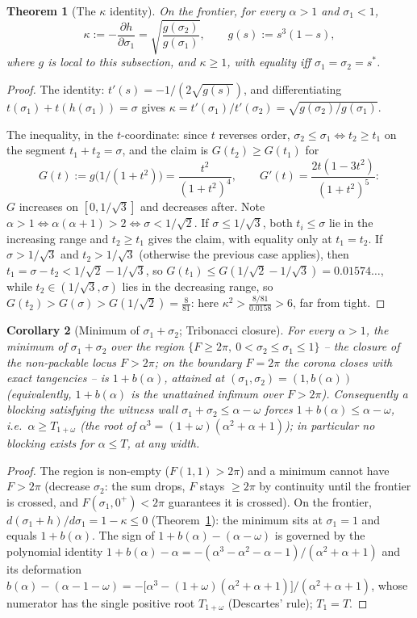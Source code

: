 \documentclass[11pt]{article}
\newtheorem{theorem}{Theorem}
\newtheorem{corollary}[theorem]{Corollary}
\theoremstyle{definition}
\begin{document}
\begin{theorem}[The $\kappa$ identity]\label{thm:Ckappa}
On the frontier, for every $\alpha>1$ and $\sigma_1<1$,
\[
\kappa:=-\frac{\partial h}{\partial\sigma_1}
=\sqrt{\frac{g(\sigma_2)}{g(\sigma_1)}},\qquad
g(s):=s^3(1-s),
\]
where $g$ is local to this subsection, and $\kappa\ge1$,
with equality iff $\sigma_1=\sigma_2=s^*$.
\end{theorem}
\begin{proof}
The identity: $t'(s)=-1/(2\sqrt{g(s)})$, and differentiating
$t(\sigma_1)+t(h(\sigma_1))=\sigma$ gives
$\kappa=t'(\sigma_1)/t'(\sigma_2)=\sqrt{g(\sigma_2)/g(\sigma_1)}$.

The inequality, in the $t$-coordinate: since $t$ reverses order,
$\sigma_2\le\sigma_1\iff t_2\ge t_1$ on the segment $t_1+t_2=\sigma$, and
the claim is $G(t_2)\ge G(t_1)$ for
\[
G(t):=g\bigl(1/(1+t^2)\bigr)=\frac{t^2}{(1+t^2)^4},\qquad
G'(t)=\frac{2t(1-3t^2)}{(1+t^2)^5}:
\]
$G$ increases on $[0,1/\sqrt3]$ and decreases after. Note
$\alpha>1\iff\alpha(\alpha+1)>2\iff\sigma<1/\sqrt2$. If
$\sigma\le1/\sqrt3$, both $t_i\le\sigma$ lie in the increasing range and
$t_2\ge t_1$ gives the claim, with equality only at $t_1=t_2$. If
$\sigma>1/\sqrt3$ and $t_2>1/\sqrt3$ (otherwise the previous case
applies), then $t_1=\sigma-t_2<1/\sqrt2-1/\sqrt3$, so
$G(t_1)\le G(1/\sqrt2-1/\sqrt3)=0.01574\dots$, while
$t_2\in(1/\sqrt3,\sigma)$ lies in the decreasing range, so
$G(t_2)>G(\sigma)>G(1/\sqrt2)=\tfrac{8}{81}$: here
$\kappa^2>\tfrac{8/81}{0.0158}>6$, far from tight.
\end{proof}

\begin{corollary}[Minimum of $\sigma_1+\sigma_2$; Tribonacci closure]
\label{cor:Cmin}
For every $\alpha>1$, the minimum of $\sigma_1+\sigma_2$ over the
region $\{F\ge2\pi,\ 0<\sigma_2\le\sigma_1\le1\}$ -- the closure of
the non-packable locus $F>2\pi$; on the boundary $F=2\pi$ the corona
closes with exact tangencies -- is
$1+b(\alpha)$, attained at $(\sigma_1,\sigma_2)=(1,b(\alpha))$
(equivalently, $1+b(\alpha)$ is the unattained infimum over
$F>2\pi$).
Consequently a blocking satisfying the witness wall
$\sigma_1+\sigma_2\le\alpha-\omega$ forces $1+b(\alpha)\le\alpha-\omega$,
i.e.\ $\alpha\ge T_{1+\omega}$ (the root of
$\alpha^3=(1+\omega)(\alpha^2+\alpha+1)$); in particular no blocking exists
for $\alpha\le T$, at any width.
\end{corollary}
\begin{proof}
The region is non-empty ($F(1,1)>2\pi$) and a minimum cannot have
$F>2\pi$ (decrease $\sigma_2$: the sum drops, $F$ stays $\ge2\pi$ by
continuity until the frontier is crossed, and
$F(\sigma_1,0^+)<2\pi$ guarantees it is crossed). On the frontier,
$d(\sigma_1+h)/d\sigma_1=1-\kappa\le0$ (Theorem~\ref{thm:Ckappa}): the
minimum sits at $\sigma_1=1$ and equals $1+b(\alpha)$. The sign of
$1+b(\alpha)-(\alpha-\omega)$ is governed by the polynomial identity
$1+b(\alpha)-\alpha=-(\alpha^3-\alpha^2-\alpha-1)/(\alpha^2+\alpha+1)$
and its deformation
$b(\alpha)-(\alpha-1-\omega)
=-\bigl[\alpha^3-(1+\omega)(\alpha^2+\alpha+1)\bigr]/(\alpha^2+\alpha+1)$,
whose numerator has the single positive root $T_{1+\omega}$ (Descartes'
rule); $T_1=T$.
\end{proof}
\end{document}
